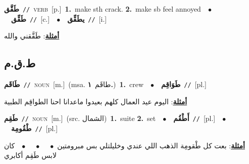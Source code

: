 \documentclass[10pt,a4paper,twoside]{article} %
\begin{document}
\begin{multicols}{2}
{\setlength\topsep{0pt}\textbf{\foreignlanguage{arabic}{طَقَّق}}\ {\color{gray}\texttt{//}\color{black}}\ \textsc{verb}\ [p.]\ \textbf{1.}~make sth crack.  \textbf{2.}~make sb feel annoyed\ \ $\bullet$\ \ \setlength\topsep{0pt}\textbf{\foreignlanguage{arabic}{طَقِّق}}\ {\color{gray}\texttt{//}\color{black}}\ [c.]\ \ $\bullet$\ \ \setlength\topsep{0pt}\textbf{\foreignlanguage{arabic}{يطَقِّق}}\ {\color{gray}\texttt{//}\color{black}}\ [i.]\  \begin{flushright}\color{gray}\foreignlanguage{arabic}{\textbf{\underline{\foreignlanguage{arabic}{أمثلة}}}: طَقَّقني والله}\end{flushright}\color{black}} \vspace{2mm}

\vspace{-3mm}
\subsection*{\color{blue}\foreignlanguage{arabic}{ط.ق.م}\color{blue}{}} 

{\setlength\topsep{0pt}\textbf{\foreignlanguage{arabic}{طَاقَم}}\ {\color{gray}\texttt{//}\color{black}}\ \textsc{noun}\ [m.]\ \color{gray}(msa. \foreignlanguage{arabic}{طاقَم}~\foreignlanguage{arabic}{\textbf{١.}})\color{black}\ \textbf{1.}~crew\ \ $\bullet$\ \ \setlength\topsep{0pt}\textbf{\foreignlanguage{arabic}{طَوَاقِم}}\ {\color{gray}\texttt{//}\color{black}}\ [pl.]\  \begin{flushright}\color{gray}\foreignlanguage{arabic}{\textbf{\underline{\foreignlanguage{arabic}{أمثلة}}}: اليوم عيد العمال كلهم بعيدوا ماعدانا احنا الطواقِم الطبية}\end{flushright}\color{black}} \vspace{2mm}

{\setlength\topsep{0pt}\textbf{\foreignlanguage{arabic}{طَقِم}}\ {\color{gray}\texttt{//}\color{black}}\ \textsc{noun}\ [m.]\ (src. \color{gray}\foreignlanguage{arabic}{الشمال}\color{black})\ \textbf{1.}~suite  \textbf{2.}~set\ \ $\bullet$\ \ \setlength\topsep{0pt}\textbf{\foreignlanguage{arabic}{أَطْقُم}}\ {\color{gray}\texttt{//}\color{black}}\ [pl.]\ \ $\bullet$\ \ \setlength\topsep{0pt}\textbf{\foreignlanguage{arabic}{طْقُومِة}}\ {\color{gray}\texttt{//}\color{black}}\ [pl.]\  \begin{flushright}\color{gray}\foreignlanguage{arabic}{\textbf{\underline{\foreignlanguage{arabic}{أمثلة}}}: بعت كل طْقومِة الذهب اللي عندي وخليلتلي بس مبرومتين\ $\bullet$\ \  \ $\bullet$\ \  \ $\bullet$\ \  كان لابس طَقِم أكابري}\end{flushright}\color{black}} \vspace{2mm}


\end{multicols}
\end{document}
